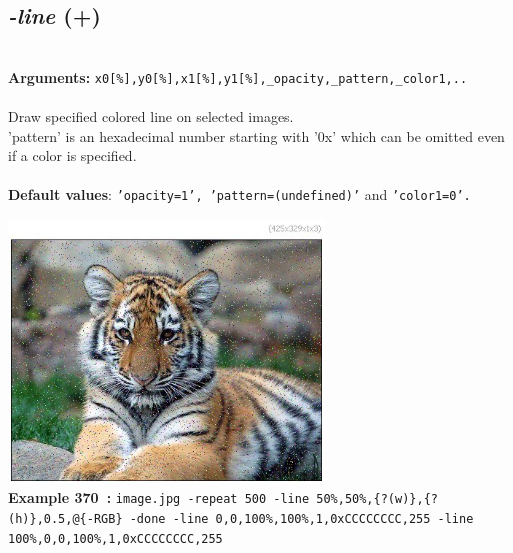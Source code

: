 \documentclass[a4paper,11pt,twoside]{book}
\begin{document}
\subsection{\emph{-line} (+)}\vspace*{-0.5em}
~\\\textbf{Arguments: } 
{\small \texttt{x0[\%],y0[\%],x1[\%],y1[\%],\_opacity,\_pattern,\_color1,..}}\\~\\
Draw specified colored line on selected images.
~\\'pattern' is an hexadecimal number starting with '0x' which can be omitted
even if a color is specified.
~\\~\\\textbf{Default values}: {\small \texttt{'opacity=1', 'pattern=(undefined)'} and \texttt{'color1=0'.}}
\begin{center}\includegraphics[keepaspectratio=true,height=7cm,width=\textwidth]{img/gmic_def370.jpg}\\
{\footnotesize \textbf{Example 370~:} \texttt{image.jpg -repeat 500 -line 50\%,50\%,\{?(w)\},\{?(h)\},0.5,@\{-RGB\} -done -line 0,0,100\%,100\%,1,0xCCCCCCCC,255 -line 100\%,0,0,100\%,1,0xCCCCCCCC,255}}
\end{center}
\end{document}
